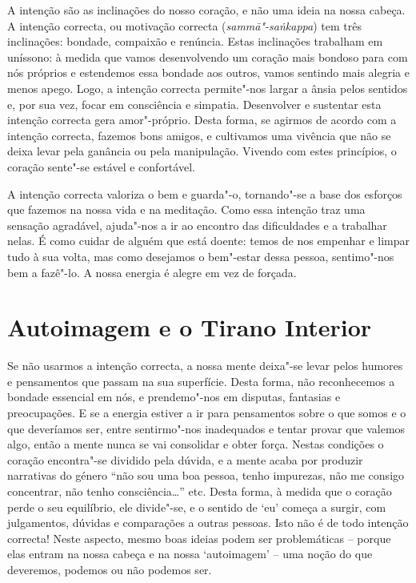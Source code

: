 A intenção são as inclinações do nosso coração, e não uma ideia na nossa
cabeça. A intenção correcta, ou motivação correcta
(\emph{sammā"-saṅkappa}) tem três inclinações: bondade, compaixão e
renúncia. Estas inclinações trabalham em uníssono: à medida que vamos
desenvolvendo um coração mais bondoso para com nós próprios e estendemos
essa bondade aos outros, vamos sentindo mais alegria e menos apego.
Logo, a intenção correcta permite"-nos largar a ânsia pelos sentidos e,
por sua vez, focar em consciência e simpatia. Desenvolver e sustentar
esta intenção correcta gera amor"-próprio. Desta forma, se agirmos de
acordo com a intenção correcta, fazemos bons amigos, e cultivamos uma
vivência que não se deixa levar pela ganância ou pela manipulação.
Vivendo com estes princípios, o coração sente"-se estável e confortável.

A intenção correcta valoriza o bem e guarda"-o, tornando"-se a base dos
esforços que fazemos na nossa vida e na meditação. Como essa intenção
traz uma sensação agradável, ajuda"-nos a ir ao encontro das dificuldades
e a trabalhar nelas. É como cuidar de alguém que está doente: temos de
nos empenhar e limpar tudo à sua volta, mas como desejamos o bem"-estar
dessa pessoa, sentimo"-nos bem a fazê"-lo. A nossa energia é alegre em vez
de forçada.

\section{Autoimagem e o Tirano Interior}

Se não usarmos a intenção correcta, a nossa mente deixa"-se levar pelos
humores e pensamentos que passam na sua superfície. Desta forma, não
reconhecemos a bondade essencial em nós, e prendemo"-nos em disputas,
fantasias e preocupações. E se a energia estiver a ir para pensamentos
sobre o que somos e o que deveríamos ser, entre sentirmo"-nos inadequados
e tentar provar que valemos algo, então a mente nunca se vai consolidar
e obter força. Nestas condições o coração encontra"-se dividido pela
dúvida, e a mente acaba por produzir narrativas do género “não sou uma
boa pessoa, tenho impurezas, não me consigo concentrar, não tenho
consciência\ldots{}” etc. Desta forma, à medida que o coração perde o seu
equilíbrio, ele divide"-se, e o sentido de `eu' começa a surgir, com
julgamentos, dúvidas e comparações a outras pessoas. Isto não é de todo
intenção correcta! Neste aspecto, mesmo boas ideias podem ser
problemáticas -- porque elas entram na nossa cabeça e na nossa
‘autoimagem’ -- uma noção do que deveremos, podemos ou não podemos ser.

